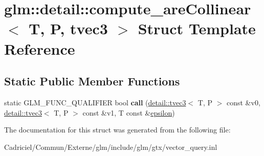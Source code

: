 \hypertarget{structglm_1_1detail_1_1compute__are_collinear_3_01_t_00_01_p_00_01tvec3_01_4}{}\section{glm\+:\+:detail\+:\+:compute\+\_\+are\+Collinear$<$ T, P, tvec3 $>$ Struct Template Reference}
\label{structglm_1_1detail_1_1compute__are_collinear_3_01_t_00_01_p_00_01tvec3_01_4}
\subsection*{Static Public Member Functions}
\begin{DoxyCompactItemize}
\item 
static G\+L\+M\+\_\+\+F\+U\+N\+C\+\_\+\+Q\+U\+A\+L\+I\+F\+I\+ER bool {\bfseries call} (\hyperlink{structglm_1_1detail_1_1tvec3}{detail\+::tvec3}$<$ T, P $>$ const \&v0, \hyperlink{structglm_1_1detail_1_1tvec3}{detail\+::tvec3}$<$ T, P $>$ const \&v1, T const \&\hyperlink{group__gtc__constants_gacb41049b8d22c8aa90e362b96c524feb}{epsilon})\hypertarget{structglm_1_1detail_1_1compute__are_collinear_3_01_t_00_01_p_00_01tvec3_01_4_a1b9e023b1518128243ec6cc5748faccc}{}\label{structglm_1_1detail_1_1compute__are_collinear_3_01_t_00_01_p_00_01tvec3_01_4_a1b9e023b1518128243ec6cc5748faccc}

\end{DoxyCompactItemize}


The documentation for this struct was generated from the following file\+:\begin{DoxyCompactItemize}
\item 
Cadriciel/\+Commun/\+Externe/glm/include/glm/gtx/vector\+\_\+query.\+inl\end{DoxyCompactItemize}
